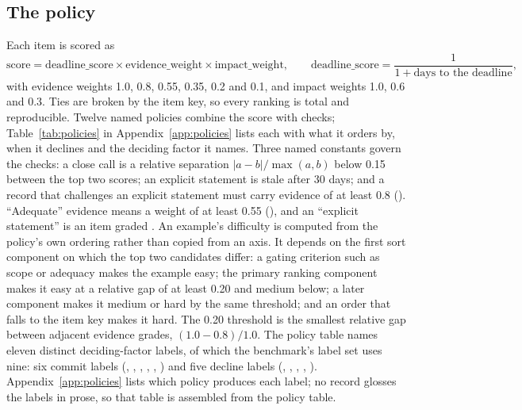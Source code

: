 \subsection{The policy}
Each item is scored as
\begin{equation}
\text{score} = \text{deadline\_score} \times \text{evidence\_weight} \times \text{impact\_weight}, \qquad \text{deadline\_score} = \frac{1}{1 + \text{days to the deadline}},
\end{equation}
with evidence weights  1.0,  0.8,  0.55,  0.35,  0.2 and  0.1, and impact weights  1.0,  0.6 and  0.3. Ties are broken by the item key, so every ranking is total and reproducible. Twelve named policies combine the score with checks; Table~\ref{tab:policies} in Appendix~\ref{app:policies} lists each with what it orders by, when it declines and the deciding factor it names. Three named constants govern the checks: a close call is a relative separation $|a-b|/\max(a,b)$ below 0.15 between the top two scores; an explicit statement is stale after 30 days; and a record that challenges an explicit statement must carry evidence of at least 0.8 (). ``Adequate'' evidence means a weight of at least 0.55 (), and an ``explicit statement'' is an item graded . An example's difficulty is computed from the policy's own ordering rather than copied from an axis. It depends on the first sort component on which the top two candidates differ: a gating criterion such as scope or adequacy makes the example easy; the primary ranking component makes it easy at a relative gap of at least 0.20 and medium below; a later component makes it medium or hard by the same threshold; and an order that falls to the item key makes it hard. The 0.20 threshold is the smallest relative gap between adjacent evidence grades, $(1.0-0.8)/1.0$. The policy table names eleven distinct deciding-factor labels, of which the benchmark's label set uses nine: six commit labels (, , , , , ) and five decline labels (, , , , ). Appendix~\ref{app:policies} lists which policy produces each label; no record glosses the labels in prose, so that table is assembled from the policy table.

